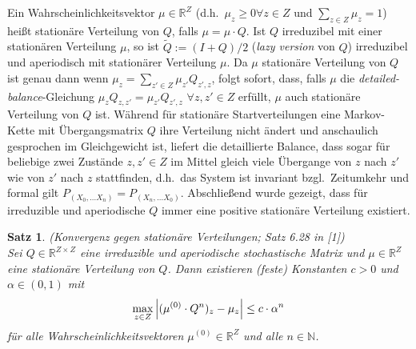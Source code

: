 \documentclass[twoside]{article}
\newcounter{lecnum}
\newtheorem{theorem}{Satz}[lecnum]
\theoremstyle{definition}
\begin{document}
Ein Wahrscheinlichkeitsvektor $\mu \in \mathbb{R}^Z$ (d.h.\ $\mu_z \geq 0 \forall z \in Z$ und $\sum_{z \in Z} \mu_z=1$) heißt stationäre Verteilung von $Q$, falls $\mu = \mu \cdot Q$. Ist $Q$ irreduzibel mit einer stationären Verteilung $\mu$, so ist $\tilde{Q}:=(I+Q)/2$ (\textit{lazy version} von $Q$) irreduzibel und aperiodisch mit stationärer Verteilung $\mu$. Da $\mu$ stationäre Verteilung von $Q$ ist genau dann wenn $\mu_z = \sum_{z' \in Z} \mu_{z'} Q_{z',z}$, folgt sofort, dass, falls $\mu$ die \textit{detailed-balance}-Gleichung $\mu_z Q_{z,z'} = \mu_{z'} Q_{z',z}$ $\forall z,z' \in Z$ erfüllt, $\mu$ auch stationäre Verteilung von $Q$ ist. Während für stationäre Startverteilungen eine Markov-Kette mit Übergangsmatrix $Q$ ihre Verteilung nicht ändert und anschaulich gesprochen im Gleichgewicht ist, liefert die detaillierte Balance, dass sogar für beliebige zwei Zustände $z,z' \in Z$ im Mittel gleich viele Übergange von $z$ nach $z'$ wie von $z'$ nach $z$ stattfinden, d.h.\ das System ist invariant bzgl.\ Zeitumkehr und formal gilt $P_{(X_0, \dots X_n)} = P_{(X_n, \dots X_0)}$. Abschließend wurde gezeigt, dass für irreduzible und aperiodische $Q$ immer eine positive stationäre Verteilung existiert.
\begin{theorem}(Konvergenz gegen stationäre Verteilungen; Satz 6.28 in [1])\\
Sei $Q \in \mathbb{R}^{Z \times Z}$ eine irreduzible und aperiodische stochastische Matrix und $\mu \in \mathbb{R}^Z$ eine stationäre Verteilung von $Q$. Dann existieren (feste) Konstanten $c>0$ und $\alpha \in (0,1)$ mit
\begin{align}
\max_{z \in Z} \abs{(\mu^{(0)} \cdot Q^n)_z - \mu_z} \leq c \cdot \alpha^n
\end{align}
für alle Wahrscheinlichkeitsvektoren $\mu^{(0)} \in \mathbb{R}^Z$ und alle $n \in \mathbb{N}$.
\end{theorem}
\end{document}
